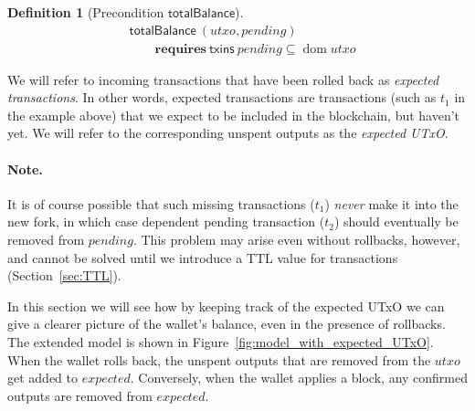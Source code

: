 \documentclass{article}
\DeclareMathOperator{\dom}{dom}
\newtheorem{definition}[lemma]{Definition}
\numberwithin{equation}{lemma}
\begin{document}
\begin{definition}[Precondition $\mathsf{totalBalance}$]
\begin{align*}
& \mathsf{totalBalance} ~ (\mathit{utxo}, \mathit{pending}) \\
& \qquad \mathbf{requires~} \mathsf{txins} ~ \mathit{pending} \subseteq \dom \mathit{utxo}
\end{align*}
\end{definition}

We will refer to incoming transactions that have been rolled back as
\emph{expected transactions}. In other words, expected transactions are
transactions (such as $t_1$ in the example above) that we expect to be included
in the blockchain, but haven't yet. We will refer to the corresponding unspent
outputs as the \emph{expected UTxO}.

\paragraph{Note.}
It is of course possible that such missing transactions ($t_1$) \emph{never}
make it into the new fork, in which case dependent pending transaction ($t_2$)
should eventually be removed from $\mathit{pending}$. This problem may arise
even without rollbacks, however, and cannot be solved until we introduce a TTL
value for transactions (Section~\ref{sec:TTL}).

In this section we will see how by keeping track of the expected UTxO we can
give a clearer picture of the wallet's balance, even in the presence of
rollbacks. The extended model is shown in
Figure~\ref{fig:model_with_expected_UTxO}. When the wallet rolls back, the
unspent outputs that are removed from the $\mathit{utxo}$ get added to
$\mathit{expected}$. Conversely, when the wallet applies a block, any confirmed
outputs are removed from $\mathit{expected}$.
\end{document}
